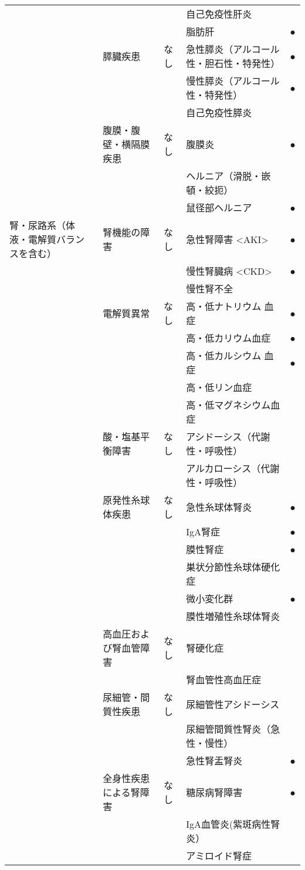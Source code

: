 \begin{xltabular}{\linewidth}{XXXXX}
 &  &  & 自己免疫性肝炎 &  \\
 &  &  & 脂肪肝 & ● \\
 & 膵臓疾患 & なし & 急性膵炎（アルコール性・胆石性・特発性） & ● \\
 &  &  & 慢性膵炎（アルコール性・特発性） & ● \\
 &  &  & 自己免疫性膵炎 &  \\
 & 腹膜・腹壁・横隔膜疾患 & なし & 腹膜炎 & ● \\
 &  &  & ヘルニア（滑脱・嵌頓・絞扼） &  \\
 &  &  & 鼠径部ヘルニア & ● \\
腎・尿路系（体液・電解質バランスを含む） & 腎機能の障害 & なし & 急性腎障害 <AKI> & ● \\
 &  &  & 慢性腎臓病 <CKD> & ● \\
 &  &  & 慢性腎不全 &  \\
 & 電解質異常 & なし & 高・低ナトリウム 血症 & ● \\
 &  &  & 高・低カリウム血症 & ● \\
 &  &  & 高・低カルシウム 血症 & ● \\
 &  &  & 高・低リン血症 &  \\
 &  &  & 高・低マグネシウム血症 &  \\
 & 酸・塩基平衡障害 & なし & アシドーシス（代謝性・呼吸性） &  \\
 &  &  & アルカローシス（代謝性・呼吸性） &  \\
 & 原発性糸球体疾患 & なし & 急性糸球体腎炎 & ● \\
 &  &  & IgA腎症 & ● \\
 &  &  & 膜性腎症 & ● \\
 &  &  & 巣状分節性糸球体硬化症 &  \\
 &  &  & 微小変化群 & ● \\
 &  &  & 膜性増殖性糸球体腎炎 &  \\
 & 高血圧および腎血管障害 & なし & 腎硬化症 &  \\
 &  &  & 腎血管性高血圧症 &  \\
 & 尿細管・間質性疾患 & なし & 尿細管性アシドーシス &  \\
 &  &  & 尿細管間質性腎炎（急性・慢性） &  \\
 &  &  & 急性腎盂腎炎 & ● \\
 & 全身性疾患による腎障害 & なし & 糖尿病腎障害 & ● \\
 &  &  & IgA血管炎(紫斑病性腎炎） &  \\
 &  &  & アミロイド腎症 &  \\

\end{xltabular}
